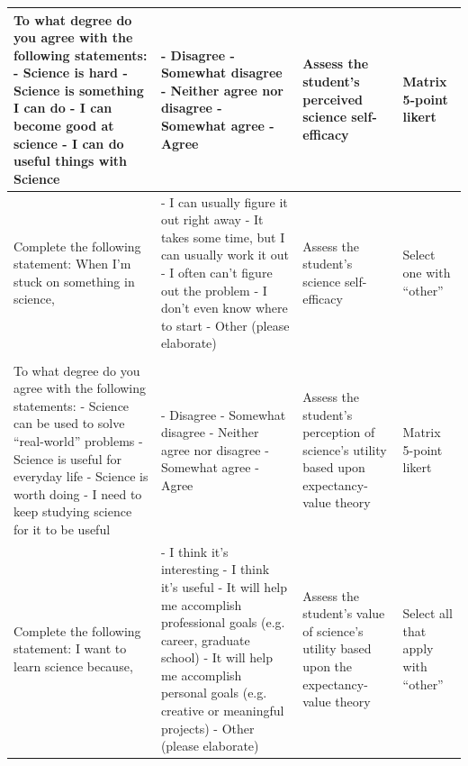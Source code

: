 \documentclass[10pt, twocolumn]{article}
\begin{document}
\begin{xltabular}{\textwidth}{|p{0.3\textwidth}|p{0.3\textwidth}|p{0.2\textwidth}|X|}
    To what degree do you agree with the following statements: \newline - Science is hard \newline - Science is something I can do \newline - I can become good at science \newline - I can do useful things with Science& - Disagree \newline - Somewhat disagree \newline - Neither agree nor disagree \newline - Somewhat agree \newline - Agree & Assess the student's perceived science self-efficacy & Matrix 5-point likert \\ \hline
    Complete the following statement: When I'm stuck on something in science, & - I can usually figure it out right away \newline - It takes some time, but I can usually work it out \newline - I often can't figure out the problem \newline - I don't even know where to start \newline - Other (please elaborate) & Assess the student's science self-efficacy & Select one with ``other'' \\ \hline
     \\ \hline
    To what degree do you agree with the following statements: \newline - Science can be used to solve ``real-world'' problems \newline - Science is useful for everyday life \newline - Science is worth doing \newline - I need to keep studying science for it to be useful & - Disagree \newline - Somewhat disagree \newline - Neither agree nor disagree \newline - Somewhat agree \newline - Agree & Assess the student's perception of science's utility based upon expectancy-value theory & Matrix 5-point likert \\ \hline
    Complete the following statement: I want to learn science because, & - I think it's interesting \newline - I think it's useful \newline - It will help me accomplish professional goals (e.g. career, graduate school) \newline - It will help me accomplish personal goals (e.g. creative or meaningful projects) \newline - Other (please elaborate) & Assess the student's value of science's utility based upon the expectancy-value theory & Select all that apply with ``other'' \\ \hline

\end{xltabular}
\end{document}
